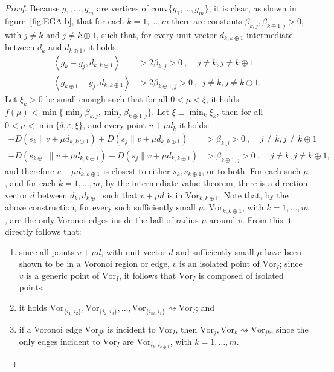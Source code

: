 \documentclass[11pt]{article}
\newcommand{\Vor}{\text{Vor}}
\newcommand{\D}[2]{D\left(#1 \parallel #2\right)}
\newcommand{\CH}[1]{\text{conv} #1 }
\begin{document}
\begin{proof}
Because $g_1,\dots,g_m$ are vertices of $\CH\{g_1,\dots,g_m\}$, 
	it is clear, as shown in figure~\ref{fig:EGA.b}, 
	that for each $k=1,\dots,m$ there are constants $\beta_{k,j},\beta_{k\oplus 1,j} > 0$, with $j\ne k$ and $j\ne k\oplus 1$, 
	such that, for every unit vector $d_{k,k\oplus 1}$ intermediate between $d_k$ and $d_{k\oplus 1}$, 
it holds:
	\begin{align}
		 \label{eq:extremal2} \left< g_k - g_j, d_{k,k\oplus 1} \right> &> 2\beta_{k,j} > 0 ~,~~~~~ j\ne k, j \ne k\oplus 1 \\
		 \label{eq:extremal3} \left< g_{k\oplus 1} - g_j, d_{k,k\oplus 1} \right> &> 2\beta_{k \oplus 1,j} > 0 ~,~~ j\ne k, j \ne k\oplus 1. 
	\end{align}
Let $\xi_k > 0$ be small enough such that for all $0 < \mu < \xi$, 
	it holds $f(\mu) < \min\{\min_j \beta_{k,j}, \min_j \beta_{k\oplus 1,j}\}$. 
Let $\xi\equiv \min_k \xi_k$, 
	then for all $0 < \mu < \min\{\delta,\varepsilon,\xi\}$, 
	and every point $v+\mu d_k$ it holds:
	\begin{align*}
		-\D{s_k}{v+\mu d_{k,k\oplus 1}} + \D{s_j}{v+\mu d_{k,k\oplus 1}} &> \beta_{k,j} > 0 ~,~~~~~  j\ne k, j \ne k\oplus 1 \\
		-\D{s_{k\oplus 1}}{v+\mu d_{k,k\oplus 1}} + \D{s_j}{v+\mu d_{k,k\oplus 1}} &> \beta_{k\oplus 1,j} > 0 ~,~~~~~  j\ne k, j \ne k\oplus 1, 
	\end{align*}
	and therefore $v+\mu d_{k,k\oplus 1}$ is closest to either $s_k,s_{k\oplus 1}$, or to both. 
For each such $\mu$, and for each  $k=1,\dots,m$, 
	by the intermediate value theorem, 
	there is a direction vector $d$ between $d_k,d_{k\oplus 1}$ such that $v+\mu d$ 
	is in $\Vor_{k,k\oplus 1}$. Note that, by the above construction, for every such sufficiently small $\mu$, 
	$\Vor_{k,k\oplus 1}$, with $k=1,\dots,m$, are the only Voronoi edges inside the ball of radius $\mu$ around $v$. 
From this it directly follows that: 
\begin{enumerate}
	\item since all points $v+\mu d$, with unit vector $d$ and sufficiently small $\mu$ 
			have been shown to be in a Voronoi region or edge, 
			$v$ is an isolated point of $\Vor_I$;
		since $v$ is a generic point of $\Vor_I$, it follows that $\Vor_I$ is composed of isolated points;
	\item it holds $\Vor_{\{i_1,i_2\}},\Vor_{\{i_2,i_3\}},\dots,\Vor_{\{i_m,i_1\}} \rightsquigarrow \Vor_I $; and 
	\item if a Voronoi edge $\Vor_{jk}$ is incident to $\Vor_I$, then $\Vor_j,\Vor_k\rightsquigarrow \Vor_{jk}$, 
		since the only edges incident to $\Vor_I$ are $\Vor_{i_k,i_{k\oplus 1}}$, with $k=1,\dots,m$. 
\end{enumerate}



\end{proof}
\end{document}
